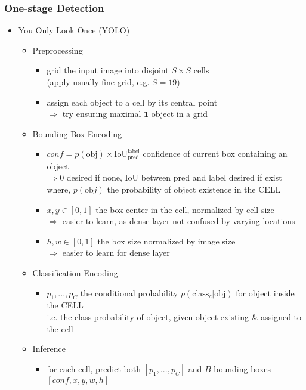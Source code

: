 \subsubsection{One-stage Detection}
\begin{itemize}
\item You Only Look Once (YOLO)
	\begin{itemize}
	\item Preprocessing
		\begin{itemize}
		\item grid the input image into disjoint $S \times S$ cells \\
		(apply usually fine grid, e.g. $S=19$)
		\item assign each object to a cell by its central point \\ 
		$\Rightarrow$ try ensuring maximal $\mathbf 1$ object in a grid
		\end{itemize}
	\item Bounding Box Encoding
		\begin{itemize}
		\item $conf=p(\text{obj}) \times \text{IoU}^\text{label}_\text{pred}$ confidence of current box containing an object \\
		$\Rightarrow 0$ desired if none, IoU between pred and label desired if exist \\
		where, $p(\text{ob}j)$ the probability of object existence in the CELL
		\item $x, y \in [0,1]$ the box center in the cell, normalized by cell size \\
		$\Rightarrow$ easier to learn, as dense layer not confused by varying locations
		\item $h, w \in [0, 1]$ the box size normalized by image size \\
		$\Rightarrow$ easier to learn for dense layer
		\end{itemize}
	\item Classification Encoding
		\begin{itemize}
		\item $p_1,...,p_C$ the conditional probability $p(\text{class}_c|\text{obj})$ for object inside the CELL \\
		i.e. the class probability of object, given object existing \& assigned to the cell
		\end{itemize}
	\item Inference
		\begin{itemize}
		\item for each cell, predict both $[p_1,...,p_C]$ and $B$ bounding boxes $[conf, x, y, w, h]$ \\

\end{itemize}
\end{itemize}
\end{itemize}
